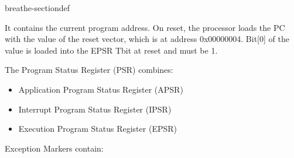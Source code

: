 \documentclass[letterpaper,10pt,english]{sphinxmanual}
\begin{document}
\begin{fulllineitems}
\begin{sphinxuseclass}{breathe-sectiondef}
\begin{fulllineitems}
\sphinxAtStartPar
It contains the current program address. On reset, the processor loads the PC with the value of the reset vector, which is at address 0x00000004. Bit{[}0{]} of the value is loaded into the EPSR T\sphinxhyphen{}bit at reset and must be 1. 

\end{fulllineitems}


\begin{fulllineitems}
\label{\detokenize{source_code:_CPPv4N16coreRegistersDef23program_status_registerE}}\label{\detokenize{source_code:_CPPv3N16coreRegistersDef23program_status_registerE}}\label{\detokenize{source_code:_CPPv2N16coreRegistersDef23program_status_registerE}}\label{\detokenize{source_code:coreRegistersDef::program_status_register__uint32_t}}
\pysigstartsignatures
\pysigstartmultiline
{}
\pysigstopmultiline
\pysigstopsignatures
\sphinxAtStartPar
The Program Status Register (PSR) combines: 

\sphinxAtStartPar
\begin{itemize}
\item {} 
\sphinxAtStartPar
Application Program Status Register (APSR)

\item {} 
\sphinxAtStartPar
Interrupt Program Status Register (IPSR)

\item {} 
\sphinxAtStartPar
Execution Program Status Register (EPSR) 

\end{itemize}


\end{fulllineitems}


\begin{fulllineitems}
\label{\detokenize{source_code:_CPPv4N16coreRegistersDef17exception_markersE}}\label{\detokenize{source_code:_CPPv3N16coreRegistersDef17exception_markersE}}\label{\detokenize{source_code:_CPPv2N16coreRegistersDef17exception_markersE}}\label{\detokenize{source_code:coreRegistersDef::exception_markers__uint32_tA}}
\pysigstartsignatures
\pysigstartmultiline
{}
\pysigstopmultiline
\pysigstopsignatures
\sphinxAtStartPar
Exception Markers contain: 


\end{fulllineitems}
\end{sphinxuseclass}
\end{fulllineitems}
\end{document}
